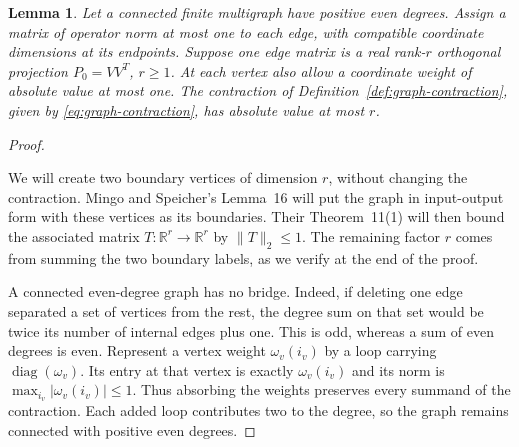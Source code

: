 \documentclass[11pt]{article}
\newtheorem{lemma}[theorem]{Lemma}
\theoremstyle{definition}
\theoremstyle{remark}
\theoremstyle{plain}
\newcommand{\R}{\mathbb R}
\DeclareMathOperator{\diag}{diag}
\begin{document}
\begin{lemma}\label{lem:graph}
Let a connected finite multigraph have positive even degrees. Assign
a matrix of operator norm at most one to each edge, with compatible
coordinate dimensions at its endpoints. Suppose one edge matrix is a
real rank-\(r\) orthogonal projection \(P_0=VV^T\), \(r\ge1\).
At each vertex also allow a coordinate weight of absolute value at most
one. The contraction of Definition~\ref{def:graph-contraction},
given by \eqref{eq:graph-contraction}, has absolute value
at most \(r\).
\end{lemma}
\begin{proof}
\begin{samepage}
We will create two boundary vertices of dimension $r$, without
changing the contraction. Mingo and Speicher's Lemma~16
\cite{mingo} will put the graph in input-output form with these
vertices as its boundaries. Their Theorem~11(1) will then bound
the associated matrix $T:\R^r\to\R^r$ by $\|T\|_2\le1$.
The remaining factor $r$ comes from summing the two boundary
labels, as we verify at the end of the proof.
\par
\end{samepage}

A connected even-degree graph has no bridge. Indeed, if deleting one
edge separated a set of vertices from the rest, the degree sum on
that set would be twice its number of internal edges plus one.
This is odd, whereas a sum of even degrees is even.
Represent a vertex weight $\omega_v(i_v)$ by a loop carrying
$\diag(\omega_v)$. Its entry at that vertex is exactly
$\omega_v(i_v)$ and its norm is $\max_{i_v}|\omega_v(i_v)|\le1$.
Thus absorbing the weights preserves every summand of the
contraction. Each added loop contributes two to the degree, so
the graph remains connected with positive even degrees.


\end{proof}
\end{document}

